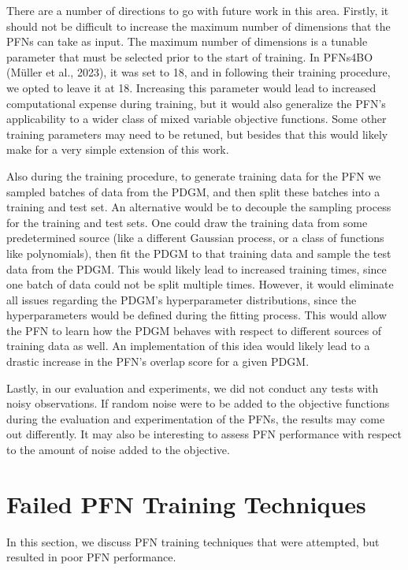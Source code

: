 \documentclass[12pt,twoside]{reedthesis}
\begin{document}
There are a number of directions to go with future work in this area. Firstly, it should not be difficult to increase the maximum number of dimensions that the PFNs can take as input. The maximum number of dimensions is a tunable parameter that must be selected prior to the start of training. In PFNs4BO (Müller et al., 2023), it was set to 18, and in following their training procedure, we opted to leave it at 18. Increasing this parameter would lead to increased computational expense during training, but it would also generalize the PFN's applicability to a wider class of mixed variable objective functions. Some other training parameters may need to be retuned, but besides that this would likely make for a very simple extension of this work.

Also during the training procedure, to generate training data for the PFN we sampled batches of data from the PDGM, and then split these batches into a training and test set. An alternative would be to decouple the sampling process for the training and test sets. One could draw the training data from some predetermined source (like a different Gaussian process, or a class of functions like polynomials), then fit the PDGM to that training data and sample the test data from the PDGM. This would likely lead to increased training times, since one batch of data could not be split multiple times. However, it would eliminate all issues regarding the PDGM's hyperparameter distributions, since the hyperparameters would be defined during the fitting process. This would allow the PFN to learn how the PDGM behaves with respect to different sources of training data as well. An implementation of this idea would likely lead to a drastic increase in the PFN's overlap score for a given PDGM.

Lastly, in our evaluation and experiments, we did not conduct any tests with noisy observations. If random noise were to be added to the objective functions during the evaluation and experimentation of the PFNs, the results may come out differently. It may also be interesting to assess PFN performance with respect to the amount of noise added to the objective.

\appendix

\hypertarget{failedpfntrainingideas}{%
\chapter{Failed PFN Training Techniques}\label{failedpfntrainingideas}}

In this section, we discuss PFN training techniques that were attempted, but resulted in poor PFN performance.
\end{document}

